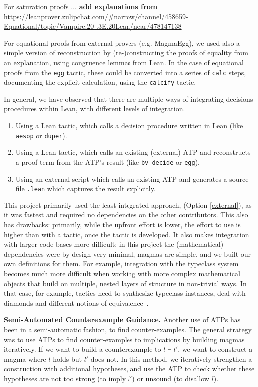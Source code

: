 For saturation proofs $\ldots$ \textbf{add explanations from } \url{https://leanprover.zulipchat.com/#narrow/channel/458659-Equational/topic/Vampire.20-.3E.20Lean/near/478147138}

For equational proofs from external provers (e.g. MagmaEgg), we used also a simple version of reconstruction by (re-)constructing the proofs of equality from an explanation, using congruence lemmas from Lean.
In the case of equational proofs from the \texttt{egg} tactic, these could be converted into a series of \texttt{calc} steps, documenting the explicit calculation, using the \texttt{calcify} tactic.

In general, we have observed that there are multiple ways of integrating decisions procedures within Lean, with different levels of integration.
\begin{enumerate}
    \item Using a Lean tactic, which calls a decision procedure written in Lean (like \texttt{aesop} or \texttt{duper}).
    \item Using a Lean tactic, which calls an existing (external) ATP and reconstructs a proof term from the ATP's result (like \texttt{bv\_decide} or \texttt{egg}).
    \item\label{external} Using an external script which calls an existing ATP and generates a source file \texttt{.lean} which captures the result explicitly.
\end{enumerate}

This project primarily used the least integrated approach, (Option \ref{external}), as it was fastest and required no dependencies on the other contributors.
This also has drawbacks: primarily, while the upfront effort is lower, the effort to use is higher than with a tactic, once the tactic is developed.
It also makes integration with larger code bases more difficult: in this project the (mathematical) dependencies were by design very minimal, magmas are simple, and we built our own definitions for them.
For example, integration with the typeclass system becomes much more difficult when working with more complex mathematical objects that build on multiple, nested layers of structure in non-trivial ways.
In that case, for example, tactics need to synthesize typeclass instances, deal with diamonds and different notions of equivalence~\cite{DBLP:conf/mkm/Wieser23}.

\textbf{Semi-Automated Counterexample Guidance.}  Another use of ATPs has been in a semi-automatic fashion, to find counter-examples.
The general strategy was to use ATPs to find counter-examples to implications by building magmas iteratively.
If we want to build a counterexample to $l \vdash l'$, we want to construct a magma where $l$ holds but $l'$ does not.
In this method, we iteratively strengthen a construction with additional hypotheses, and use the ATP to check whether these hypotheses are not too strong (to imply $l'$) or unsound (to disallow $l$).

